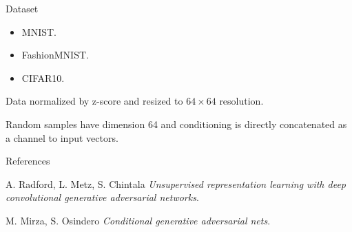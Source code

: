 \documentclass{beamer}
\begin{document}
\begin{frame}{Dataset}
    \begin{itemize}
        \item MNIST.
        \item FashionMNIST.
        \item CIFAR10.
    \end{itemize}
    Data normalized by z-score and resized to $64 \times 64$ resolution.

    Random samples have dimension 64 and conditioning is directly concatenated as a channel to input vectors.
\end{frame}


\begin{frame}{References}
    \begin{thebibliography}{}

        A. Radford, L. Metz, S. Chintala
        \newblock \emph{Unsupervised representation learning with deep convolutional generative adversarial networks}.

        M. Mirza, S. Osindero
        \newblock \emph{Conditional generative adversarial nets}.

    \end{thebibliography}
\end{frame}
\end{document}
